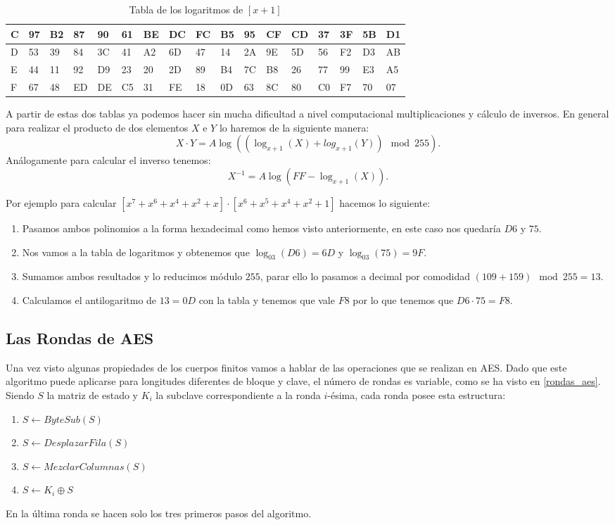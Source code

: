 \begin{table}[!htb]
\begin{adjustwidth}{-.8in}{-.8in}
\begin{tabular}{|l|l|l|l|l|l|l|l|l|l|l|l|l|l|l|l|l|}
C & 97 & B2 & 87 & 90 & 61 & BE & DC & FC & B5 & 95 & CF & CD & 37 & 3F & 5B & D1 \\ \hline
D & 53 & 39 & 84 & 3C & 41 & A2 & 6D & 47 & 14 & 2A & 9E & 5D & 56 & F2 & D3 & AB \\ \hline
E & 44 & 11 & 92 & D9 & 23 & 20 & 2D & 89 & B4 & 7C & B8 & 26 & 77 & 99 & E3 & A5 \\ \hline
F & 67 & 48 & ED & DE & C5 & 31 & FE & 18 & 0D & 63 & 8C & 80 & C0 & F7 & 70 & 07 \\ \hline
\end{tabular}
	\label{potenciasinversas}
    \end{adjustwidth}
\caption{Tabla de los logaritmos de $[x+1]$}
\end{table}
\newpage
A partir de estas dos tablas ya podemos hacer sin mucha dificultad a nivel computacional multiplicaciones y cálculo de inversos. En general para realizar el producto de dos elementos $X$ e $Y$ lo haremos de la siguiente manera:
$$
	X\cdot Y = A\log((\log_{x+1}(X)+log_{x+1}(Y)) \mod 255).
$$
Análogamente para calcular el inverso tenemos:
$$
	X^{-1} = A\log(FF-\log_{x+1}(X)).
$$

Por ejemplo para calcular $[x^7+x^6+x^4+x^2+x]\cdot[x^6+x^5+x^4+x^2+1]$ hacemos lo siguiente:
\begin{enumerate}
	\item Pasamos ambos polinomios a la forma hexadecimal como hemos visto anteriormente, en este caso nos quedaría $D6$ y $75$.
	\item Nos vamos a la tabla de logaritmos y obtenemos que $\log_{03}(D6)=6D$ y $\log_{03}(75)=9F$.
	\item Sumamos ambos resultados y lo reducimos módulo $255$, parar ello lo pasamos a decimal por comodidad $(109+159)\mod255=13$.
	\item Calculamos el antilogaritmo de $13=0D$ con la tabla y tenemos que vale $F8$ por lo que tenemos que $D6\cdot 75 = F8$.
\end{enumerate}

\subsection{Las Rondas de AES}
Una vez visto algunas propiedades de los cuerpos finitos vamos a hablar de las operaciones que se realizan en AES.
Dado que este algoritmo puede aplicarse para longitudes diferentes de bloque y clave, el número de rondas es variable, como se ha visto en \ref{rondas_aes}.\\
Siendo $S$ la matriz de estado y $K_i$ la subclave correspondiente a la ronda $i$-ésima, cada ronda posee esta estructura:
\begin{enumerate}
	\item $S \leftarrow ByteSub(S)$
	\item $S \leftarrow DesplazarFila(S)$
	\item $S \leftarrow MezclarColumnas(S)$
	\item $S \leftarrow K_i \oplus S$
\end{enumerate}
En la última ronda se hacen solo los tres primeros pasos del algoritmo.

